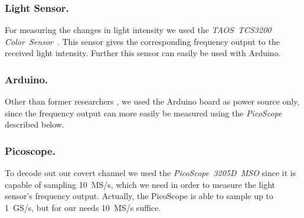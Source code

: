 \subsubsection{Light Sensor.} For measuring the changes in light intensity we used the \textit{TAOS~TCS3200 Color~Sensor}~\cite{TODO:bibid}. This sensor gives the corresponding frequency output to the received light intensity. Further this sensor can easily be used with Arduino.  
 
\subsubsection{Arduino.} Other than former researchers \cite{Ronen:2016:EFAIDCSL}, we used the Arduino board as power source only, since the frequency output can more easily be measured using the \textit{PicoScope} described below. 
\subsubsection{Picoscope.} To decode out our covert channel we used the \textit{PicoScope~3205D~MSO} since it is capable of sampling 10~MS/s, which we need in order to measure the light sensor's frequency output. Actually, the PicoScope is able to sample up to 1~GS/s, but for our needs 10~MS/s suffice.

